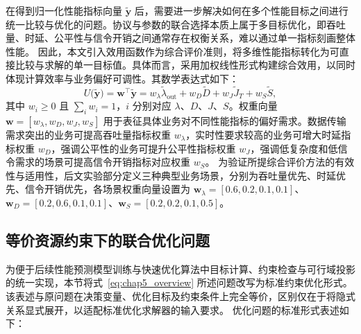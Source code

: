 在得到归一化性能指标向量 $\tilde{\mathbf{y}}$ 后，需要进一步解决如何在多个性能目标之间进行统一比较与优化的问题。协议与参数的联合选择本质上属于多目标优化，即吞吐量、时延、公平性与信令开销之间通常存在权衡关系，难以通过单一指标刻画整体性能。
因此，本文引入效用函数作为综合评价准则，将多维性能指标转化为可直接比较与求解的单一目标值。具体而言，采用加权线性形式构建综合效用，以同时体现计算效率与业务偏好可调性。其数学表达式如下：
\begin{equation}
	U\big(\tilde{\mathbf{y}}\big)= \mathbf{w}^\top  \tilde{\mathbf{y}}  = 
	w_{\lambda}\tilde{\lambda}_{\mathrm{out}}
	+w_{D}\tilde{D}
	+w_{J}\tilde{J}_T
	+w_{S}\tilde{S},
\end{equation}
其中 $w_i\ge 0$ 且 $\sum_i w_i=1$，$i$ 分别对应 $\lambda$、$D$、$J$、$S$。权重向量 $\mathbf{w}=[w_{\lambda}, w_D, w_J, w_S]$ 用于表征具体业务对不同性能指标的偏好需求。数据传输需求突出的业务可提高吞吐量指标权重 $w_{\lambda}$，实时性要求较高的业务可增大时延指标权重 $w_D$，强调公平性的业务可提升公平性指标权重 $w_J$，强调低复杂度和低信令需求的场景可提高信令开销指标对应权重 $w_S$。
为验证所提综合评价方法的有效性与适用性，后文实验部分定义三种典型业务场景，分别为吞吐量优先、时延优先、信令开销优先，各场景权重向量设置为 $\mathbf{w}_{\lambda}=[0.6, 0.2, 0.1, 0.1]$、$\mathbf{w}_{D}=[0.2, 0.6, 0.1, 0.1]$、$\mathbf{w}_{S}=[0.2, 0.2, 0.1, 0.5]$。


\subsection{等价资源约束下的联合优化问题}
\label{subsec:equiv_constrained_opt}
为便于后续性能预测模型训练与快速优化算法中目标计算、约束检查与可行域投影的统一实现，本节将式~\eqref{eq:chap5_overview} 所述问题改写为标准约束优化形式。该表述与原问题在决策变量、优化目标及约束条件上完全等价，区别仅在于将隐式关系显式展开，以适配标准优化求解器的输入要求。
优化问题的标准形式表述如下：

